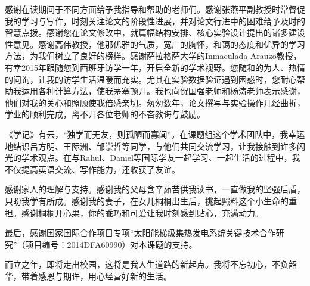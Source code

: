 \begin{ack}
感谢在读期间于不同方面给予我指导和帮助的老师们。感谢张燕平副教授时常督促我的学习与写作，时刻关注论文的阶段性进展，并对论文行进中的困难给予及时的智慧点拨。感谢您在论文修改中，就篇幅结构安排、核心实验设计提出的诸多建设性意见。感谢高伟教授，他那优雅的气质，宽广的胸怀，和蔼的态度和优异的学习方法，为我们树立了良好的榜样。感谢萨拉格萨大学的Inmaculada Arauzo教授，有幸2015年跟随您到西班牙访学一年，开启全新的学术视野。您随和的为人、热情的问询，让我的访学生活温暖而充实。尤其在实验数据验证遇到困惑时，您耐心帮助我运用各种计算方法，使我茅塞顿开。我也向贺国强老师和杨涛老师表示感谢，他们对我的关心和照顾使我倍感亲切。匆匆数年，论文撰写与实验操作几经曲折，学业的顺利完成，离不开各位老师的不吝教诲与鼓励。

《学记》有云，“独学而无友，则孤陋而寡闻”。在课题组这个学术团队中，我幸运地结识吕方明、王际洲、邹崇哲等同学，与他们共同交流学习，让我接触到许多闪光的学术观点。在与Rahul、Daniel等国际学友一起学习、一起生活的过程中，我不仅提高英语交流、写作能力，还收获了友谊。

感谢家人的理解与支持。感谢我的父母含辛茹苦供我读书，一直做我的坚强后盾，只盼我学有所成。感谢我的妻子，在女儿桐桐出生后，挑起照料这个小生命的重担。感谢桐桐开心果，你的乖巧和可爱让我时刻感到贴心，充满动力。

最后，感谢国家国际合作项目专项“太阳能梯级集热发电系统关键技术合作研究”（项目编号：2014DFA60990）对本课题的支持。

而立之年，即将走出校园，这将是我人生道路的新起点。我将不忘初心，不负韶华，带着感恩与期许，用心经营好新的生活。
%	


\end{ack}
